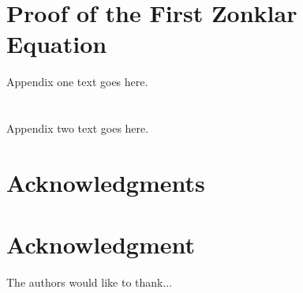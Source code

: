 \documentclass[10pt,journal,compsoc,onecolumn]{IEEEtran}
\begin{document}
%


\appendices
\section{Proof of the First Zonklar Equation}
Appendix one text goes here.

\section{}
Appendix two text goes here.


\ifCLASSOPTIONcompsoc
  \section*{Acknowledgments}
\else
  \section*{Acknowledgment}
\fi


The authors would like to thank...


\ifCLASSOPTIONcaptionsoff
  \newpage
\fi



\end{document}
